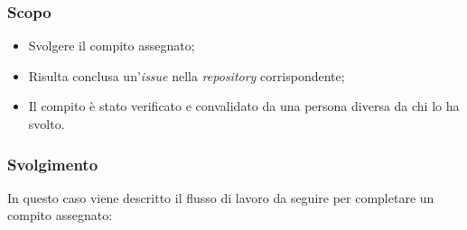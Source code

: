 \subsubsection*{Scopo}
\begin{itemize}
	\item Svolgere il compito assegnato;
	\item Risulta conclusa un'\textit{issue\g} nella \textit{repository\g}
	      corrispondente;
	\item Il compito è stato verificato e convalidato da una persona diversa
	      da chi lo ha svolto.
\end{itemize}

\subsubsection*{Svolgimento}
In questo caso viene descritto il flusso di lavoro da seguire per completare
un compito assegnato:

